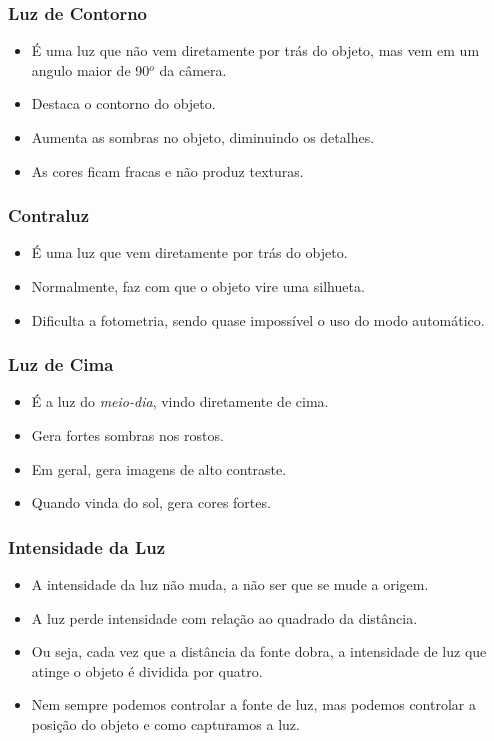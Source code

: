 
\begin{frame}
  \frametitle{Luz de Contorno}
  \begin{itemize}
    \item É uma luz que não vem diretamente por trás do objeto, mas vem em um angulo maior de 90$^o$ da câmera.
    \item Destaca o contorno do objeto.
    \item Aumenta as sombras no objeto, diminuindo os detalhes.
    \item As cores ficam fracas e não produz texturas.
  \end{itemize}
\end{frame}


\begin{frame}
  \frametitle{Contraluz}
  \begin{itemize}
    \item É uma luz que vem diretamente por trás do objeto.
    \item Normalmente, faz com que o objeto vire uma silhueta.
    \item Dificulta a fotometria, sendo quase impossível o uso do modo automático.
  \end{itemize}
\end{frame}


\begin{frame}
  \frametitle{Luz de Cima}
  \begin{itemize}
    \item É a luz do \textit{meio-dia}, vindo diretamente de cima.
    \item Gera fortes sombras nos rostos.
    \item Em geral, gera imagens de alto contraste.
    \item Quando vinda do sol, gera cores fortes.
  \end{itemize}
\end{frame}


\begin{frame}
    \frametitle{Intensidade da Luz}
    \begin{itemize}
      \item A intensidade da luz não muda, a não ser que se mude a origem.
      \item A luz perde intensidade com relação ao quadrado da distância.
      \item Ou seja, cada vez que a distância da fonte dobra, a intensidade
      de luz que atinge o objeto é dividida por quatro.
      \item Nem sempre podemos controlar a fonte de luz, mas podemos controlar
      a posição do objeto e como capturamos a luz.
    \end{itemize}
\end{frame}

